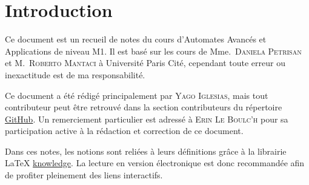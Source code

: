 \section{Introduction}

Ce document est un recueil de notes du cours d'Automates Avancés et Applications de niveau M1. Il est
basé sur les cours de Mme.~\textsc{Daniela Petrisan} et M.~\textsc{Roberto Mantaci} à Université Paris Cité, cependant toute
erreur ou inexactitude est de ma responsabilité.

Ce document a été rédigé principalement par \textsc{Yago Iglesias}, mais tout contributeur peut être retrouvé dans
la section contributeurs du répertoire \href{https://github.com/Yag000/automates-avances-notes/graphs/contributors}{GitHub}.
Un remerciement particulier est adressé à \textsc{Erin Le Boulc’h} pour sa participation active à la rédaction et correction
de ce document.

Dans ces notes, les notions sont reliées à leurs définitions grâce à la librairie LaTeX \href{https://ctan.org/pkg/knowledge?lang=en}{knowledge}.
La lecture en version électronique est donc recommandée afin de profiter pleinement des liens interactifs.
